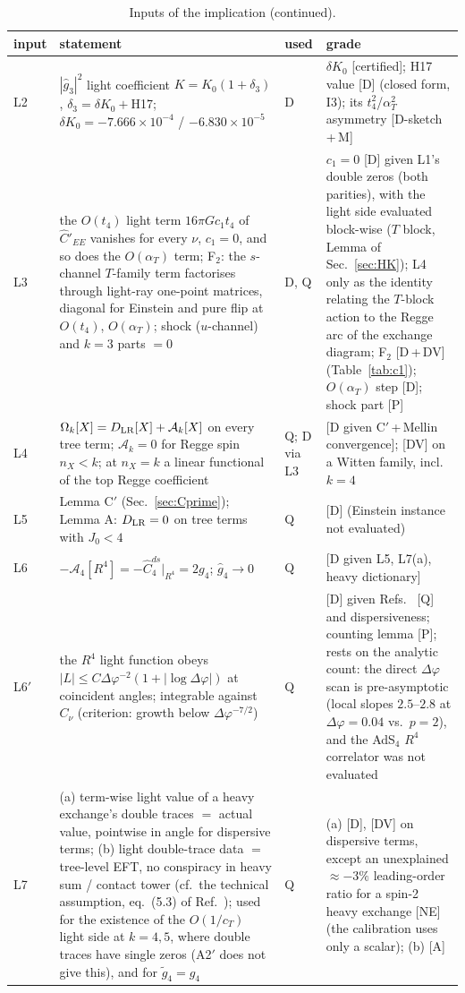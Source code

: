 \documentclass[aps,prl,onecolumn,superscriptaddress,nofootinbib]{revtex4-2}
\begin{document}
\begin{table}[!htbp]
\addtocounter{table}{-1}
\caption{Inputs of the implication (continued).}
\scriptsize
\begin{ruledtabular}
\begin{tabular}{L{1.5cm}L{9.6cm}L{0.8cm}L{4.3cm}}
input & statement & used & grade\\\hline
L2 & $|\hat g_3|^2$ light coefficient $K=K_0(1+\delta_3)$, $\delta_3=\delta K_0+$H17; $\delta K_0=-7.666\times10^{-4}$ / $-6.830\times10^{-5}$ & D & $\delta K_0$ [certified]; H17 value [D] (closed form, I3); its $t_4^2$/$\alpha_T^2$ asymmetry [D-sketch\,+\,M]\\
L3 & the $O(t_4)$ light term $16\pi Gc_1t_4$ of $\hat C'_{EE}$ vanishes for every $\nu$, $c_1=0$, and so does the $O(\alpha_T)$ term; F$_2$: the $s$-channel $T$-family term factorises through light-ray one-point matrices, diagonal for Einstein and pure flip at $O(t_4)$, $O(\alpha_T)$; shock ($u$-channel) and $k=3$ parts $=0$ & D, Q & $c_1=0$ [D] given L1's double zeros (both parities), with the light side evaluated block-wise ($T$ block, Lemma of Sec.~\ref{sec:HK}); L4 only as the identity relating the $T$-block action to the Regge arc of the exchange diagram; F$_2$ [D\,+\,DV] (Table~\ref{tab:c1}); $O(\alpha_T)$ step [D]; shock part [P]\\
L4 & $\Omega_k[X]=D_{\rm LR}[X]+\mathcal A_k[X]$ on every tree term; $\mathcal A_k=0$ for Regge spin $n_X<k$; at $n_X=k$ a linear functional of the top Regge coefficient & Q; D via L3 & [D given C$'$\,+\,Mellin convergence]; [DV] on a Witten family, incl.\ $k=4$\\
L5 & Lemma C$'$ (Sec.~\ref{sec:Cprime}); Lemma A: $D_{\rm LR}=0$ on tree terms with $J_0<4$ & Q & [D] (Einstein instance not evaluated)\\
L6 & $-\mathcal A_4[R^4]=-\hat C_4^{ds}|_{R^4}=2g_4$; $\hat g_4\to0$ & Q & [D given L5, L7(a), heavy dictionary]\\
L6$'$ & the $R^4$ light function obeys $|L|\le C\Delta\varphi^{-2}(1+|\log\Delta\varphi|)$ at coincident angles; integrable against $C_\nu$ (criterion: growth below $\Delta\varphi^{-7/2}$) & Q & [D] given Refs.~\cite{Paulos,CGPspin,PenedonesMellin} [Q] and dispersiveness; counting lemma [P]; rests on the analytic count: the direct $\Delta\varphi$ scan is pre-asymptotic (local slopes $2.5$--$2.8$ at $\Delta\varphi=0.04$ vs.\ $p=2$), and the AdS$_4$ $R^4$ correlator was not evaluated\\
L7 & (a) term-wise light value of a heavy exchange's double traces $=$ actual value, pointwise in angle for dispersive terms; (b) light double-trace data $=$ tree-level EFT, no conspiracy in heavy sum / contact tower (cf.\ the technical assumption, eq.~(5.3) of Ref.~\cite{CHMRS}); used for the existence of the $O(1/c_T)$ light side at $k=4,5$, where double traces have single zeros (A2$'$ does not give this), and for $\tilde g_4=g_4$ & Q & (a) [D], [DV] on dispersive terms, except an unexplained $\approx-3\%$ leading-order ratio for a spin-2 heavy exchange [NE] (the calibration uses only a scalar); (b) [A]\\

\end{tabular}
\end{ruledtabular}
\end{table}
\end{document}

